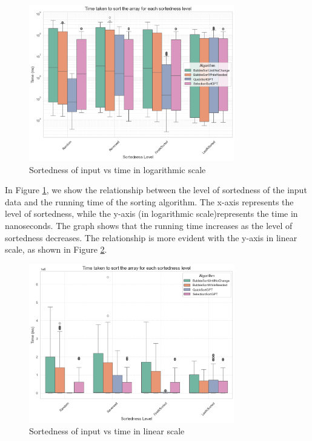 \documentclass[unicode,11pt,a4paper,oneside,numbers=endperiod,openany]{scrartcl}
\begin{document}
    \begin{figure}[htbp]
        \centering
        \includegraphics[width=0.8\textwidth]{./fig/hip1.png}
        \caption{Sortedness of input vs time in logarithmic scale}
        \label{fig:hip1}
    \end{figure}

    In Figure \ref{fig:hip1}, we show the relationship between the level of sortedness of the input data and the running time of the sorting algorithm. The x-axis represents the level of sortedness, while the y-axis (in logarithmic scale)represents the time in nanoseconds. The graph shows that the running time increases as the level of sortedness decreases. The relationship is more evident with the y-axis in linear scale, as shown in Figure \ref{fig:hip1_linear}.\\
    \hfill

    \begin{figure}[htbp]
        \centering
        \includegraphics[width=0.8\textwidth]{./fig/hip1-nonLog.png}
        \caption{Sortedness of input vs time in linear scale}
        \label{fig:hip1_linear}
    \end{figure}
\end{document}
